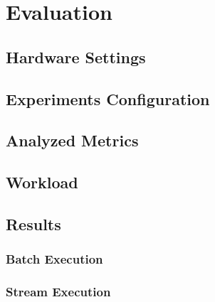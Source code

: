 \chapter{Evaluation} \label{chap:evaluation}

\section{Hardware Settings}

\section{Experiments Configuration}

\section{Analyzed Metrics}

\section{Workload}

\section{Results}

\subsection{Batch Execution}

\subsection{Stream Execution}
